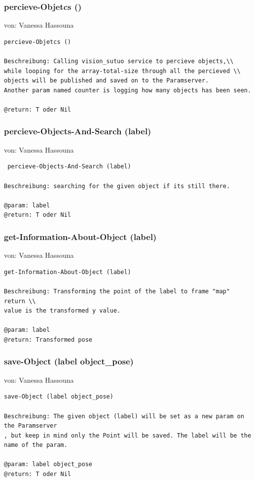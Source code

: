 \documentclass{suturo}
\makeatletter
\newcommand{\chapterauthor}[1]{%
  {\parindent0pt\vspace*{-27pt}%
  \linespread{0}\small\begin{flushright}von: #1\end{flushright}%
  \par\nobreak\vspace*{0pt}}
  \@afterheading%
}
\makeatother
\begin{document}
\subsubsection{ percieve-Objetcs ()}
\chapterauthor{Vanessa Hassouna}
\begin{verbatim}
percieve-Objetcs ()

Beschreibung: Calling vision_sutuo service to percieve objects,\\
while looping for the array-total-size through all the percieved \\
objects will be published and saved on to the Paramserver.
Another param named counter is logging how many objects has been seen.

@return: T oder Nil
\end{verbatim}

\subsubsection{ percieve-Objects-And-Search (label)}
\chapterauthor{Vanessa Hassouna}
\begin{verbatim}
 percieve-Objects-And-Search (label)

Beschreibung: searching for the given object if its still there.

@param: label
@return: T oder Nil
\end{verbatim}


\subsubsection{get-Information-About-Object (label)}
\chapterauthor{Vanessa Hassouna}
\begin{verbatim}
get-Information-About-Object (label)

Beschreibung: Transforming the point of the label to frame "map" return \\
value is the transformed y value.

@param: label
@return: Transformed pose
\end{verbatim}

\subsubsection{save-Object (label object\_pose)}
\chapterauthor{Vanessa Hassouna}
\begin{verbatim}
save-Object (label object_pose)

Beschreibung: The given object (label) will be set as a new param on the Paramserver
, but keep in mind only the Point will be saved. The label will be the name of the param.

@param: label object_pose
@return: T oder Nil
\end{verbatim}
\end{document}
